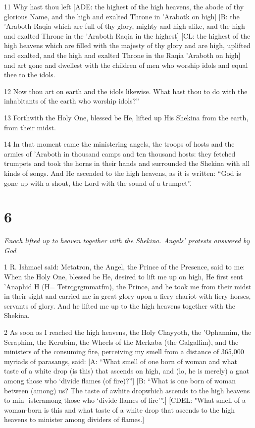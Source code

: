 \par 11 Why hast thou left [ADE: the highest of the high heavens, the abode of thy glorious Name, and the high and exalted Throne in 'Arabotk on high] [B: the 'Araboth Raqia which are full of thy glory, mighty and high alike, and the high and exalted Throne in the 'Araboth Raqia in the highest] [CL: the highest of the high heavens which are filled with the majesty of thy glory and are high, uplifted and exalted, and the high and exalted Throne in the Raqia 'Araboth on high] and art gone and dwellest with the children of men who worship idols and equal thee to the idols. 

\par 12 Now thou art on earth and the idols likewise. What hast thou to do with the inhabitants of the earth who worship idols?”

\par 13 Forthwith the Holy One, blessed be He, lifted up His Shekina from the earth, from their midst. 

\par 14 In that moment came the ministering angels, the troops of hosts and the armies of 'Araboth in thousand camps and ten thousand hosts: they fetched trumpets and took the horns in their hands and surrounded the Shekina with all kinds of songs. And He ascended to the high heavens, as it is written: “God is gone up with a shout, the Lord with the sound of a trumpet”. 

\chapter{6}

\par \textit{Enoch lifted up to heaven together with the Shekina. Angels' protests answered by God}

\par 1 R. Ishmael said: Metatron, the Angel, the Prince of the Presence, said to me: When the Holy One, blessed be He, desired to lift me up on high, He first sent 'Anaphid H (H= Tetrqgrgmmatfm), the Prince, and he took me from their midst in their sight and carried me in great glory upon a fiery chariot with fiery horses, servants of glory. And he lifted me up to the high heavens together with the Shekina. 

\par 2 As soon as I reached the high heavens, the Holy Chayyoth, the 'Ophannim, the Seraphim, the Kerubim, the Wheels of the Merkaba (the Galgallim), and the ministers of the consuming fire, perceiving my smell from a distance of 365,000 myriads of parasangs, said: [A: “What smell of one born of woman and what taste of a white drop (is this) that ascends on high, and (lo, he is merely) a gnat among those who ‘divide flames (of fire)?”] [B: “What is one born of woman between (among) us? The taste of awhite dropwhich ascends to the high heavens to min- isteramong those who ‘divide flames of fire’”.] [CDEL: "What smell of a woman-born is this and what taste of a white drop that ascends to the high heavens to minister among dividers of flames.] 

